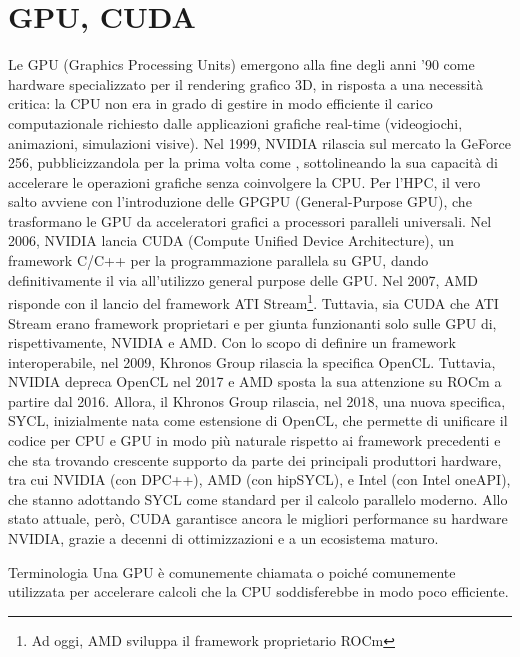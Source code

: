 \chapter{GPU, CUDA}
Le GPU (Graphics Processing Units) emergono alla fine degli anni '90 come hardware specializzato per il rendering grafico 3D, in risposta a una necessità critica: la CPU non era in grado di gestire in modo efficiente il carico computazionale richiesto dalle applicazioni grafiche real-time (videogiochi, animazioni, simulazioni visive).
Nel 1999, NVIDIA rilascia sul mercato la GeForce 256, pubblicizzandola per la prima volta come , sottolineando la sua capacità di accelerare le operazioni grafiche senza coinvolgere la CPU. 
Per l'HPC, il vero salto avviene con l'introduzione delle GPGPU (General-Purpose GPU), che trasformano le GPU da acceleratori grafici a processori paralleli universali.
Nel 2006, NVIDIA lancia CUDA (Compute Unified Device Architecture), un framework C/C++ per la programmazione parallela su GPU, dando definitivamente il via all'utilizzo general purpose delle GPU. 
Nel 2007, AMD risponde con il lancio del framework ATI Stream\footnote{Ad oggi, AMD sviluppa il framework proprietario ROCm}. 
Tuttavia, sia CUDA che ATI Stream erano framework proprietari e per giunta funzionanti solo sulle GPU di, rispettivamente, NVIDIA e AMD.
Con lo scopo di definire un framework interoperabile, nel 2009, Khronos Group rilascia la specifica OpenCL.
Tuttavia, NVIDIA depreca OpenCL nel 2017 e AMD sposta la sua attenzione su ROCm a partire dal 2016. 
Allora, il Khronos Group rilascia, nel 2018, una nuova specifica, SYCL, inizialmente nata come estensione di OpenCL, che permette di unificare il codice per CPU e GPU in modo più naturale rispetto ai framework precedenti e che sta trovando crescente supporto da parte dei principali produttori hardware, tra cui NVIDIA (con DPC++), AMD (con hipSYCL), e Intel (con Intel oneAPI), che stanno adottando SYCL come standard per il calcolo parallelo moderno.
Allo stato attuale, però, CUDA garantisce ancora le migliori performance su hardware NVIDIA, grazie a decenni di ottimizzazioni e a un ecosistema maturo.

\begin{note}{Terminologia}
Una GPU è comunemente chiamata  o  poiché comunemente utilizzata per accelerare calcoli  che la CPU soddisferebbe in modo poco efficiente.
\end{note}

